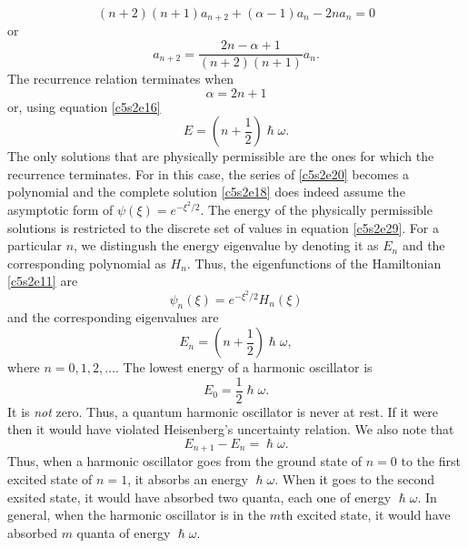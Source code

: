 \begin{equation}\label{c5s2e26}
(n+2)(n+1)a_{n+2} + (\alpha - 1)a_n - 2na_n = 0
\end{equation}
or
\begin{equation}\label{c5s2e27}
a_{n+2} = \frac{2n - \alpha + 1}{(n+2)(n+1)}a_n.
\end{equation}
The recurrence relation terminates when
\begin{equation}\label{c5s2e28}
\alpha = 2n + 1
\end{equation}
or, using equation \eqref{c5s2e16}
\begin{equation}\label{c5s2e29}
E = \left(n + \frac{1}{2}\right)\hslash\omega.
\end{equation}
The only solutions that are physically permissible are the ones for which the
recurrence terminates. For in this case, the series of \eqref{c5s2e20} becomes
a polynomial and the complete solution \eqref{c5s2e18} does indeed assume the
asymptotic form of $\psi(\xi) = e^{-\xi^2/2}$. The energy of the physically
permissible solutions is restricted to the discrete set of values in equation
\eqref{c5s2e29}. For a particular $n$, we distingush the energy eigenvalue by
denoting it as $E_n$ and the corresponding polynomial as $H_n$. Thus, the 
eigenfunctions of the Hamiltonian \eqref{c5s2e11} are
\begin{equation}\label{c5s2e30}
\psi_n(\xi) = e^{-\xi^2/2}H_n(\xi)
\end{equation}
and the corresponding eigenvalues are
\begin{equation}\label{c5s3e31}
E_n = \left(n + \frac{1}{2}\right)\hslash\omega,
\end{equation}
where $n = 0, 1, 2, \ldots$. The lowest energy of a harmonic oscillator is
\begin{equation}\label{c5s3e32}
E_0 = \frac{1}{2}\hslash\omega.
\end{equation}
It is \emph{not} zero. Thus, a quantum harmonic oscillator is never at rest. If 
it were then it would have violated Heisenberg's uncertainty relation. We also 
note that
\begin{equation}\label{c5s2e33}
E_{n+1} - E_n = \hslash\omega.
\end{equation}
Thus, when a harmonic oscillator goes from the ground state of $n = 0$ to the 
first excited state of $n = 1$, it absorbs an energy $\hslash\omega$. When it
goes to the second exsited state, it would have absorbed two quanta, each one 
of energy $\hslash\omega$. In general, when the harmonic oscillator is in the
$m$th excited state, it would have absorbed $m$ quanta of energy $\hslash
\omega$.


